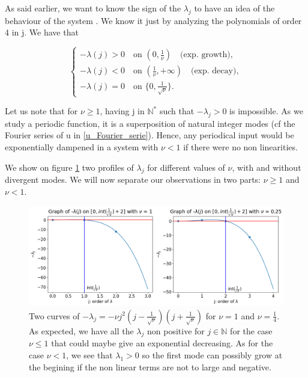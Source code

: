 \documentclass[12pt]{article}
\begin{document}
As said earlier, we want to know the sign of the $\lambda_j$ to have an idea of the behaviour of the system .
We know it just by analyzing the polynomials of order 4 in j. We have that

\begin{equation}
\left\{
\begin{aligned}
    -\lambda(j) > 0 \quad  \text{on } (0, \frac{1}{\nu}) \quad \text{(exp. growth)},\\
    -\lambda(j) < 0 \quad  \text{on } (\frac{1}{\nu}, +\infty)  \quad \text{(exp. decay)},\\
    -\lambda(j) = 0 \quad \text{on } \{0, \frac{1}{\sqrt{\nu}}\}.
\end{aligned}
\right.
\end{equation}

Let us note that for $\nu \geq 1$, having j in $\mathbb{N}^*$ such that $-\lambda_j > 0$ is impossible. As we study a periodic function,
 it is a superposition of natural integer modes (cf the Fourier series of u in \ref{u_Fourier_serie}). Hence, any periodical input would 
 be exponentially dampened in a system with $\nu <1 $ if there were no non linearities. 

We show on figure \ref{fig:KS_eq_lambda_growing_and_dampening} two profiles of $\lambda_j$ for different values of $\nu$, with and without
divergent modes. We will now separate our observations in two parts: $\nu \geq1$ and $\nu <1$.
\\

\begin{figure}[h]
\includegraphics[width=1\textwidth]{KS_eq/plot_dispersion_nu_1_1-4.png}
\caption{Two curves of $-\lambda_j = -\nu j^2(j-\frac{1}{\sqrt{\nu}})(j+\frac{1}{\sqrt{\nu}})$ for $\nu=1$ and $\nu=\frac{1}{4}$. 
As expected, we have all the $\lambda_j$ non positive for $j \in \mathbb{N}$ for the case $\nu \leq 1$ that could maybe give
an exponential decreasing. As for the case $\nu < 1$, we see that $\lambda_1 >0$ so the first mode can possibly grow at the begining if the 
 non linear terms are not to large and negative.} 
\label{fig:KS_eq_lambda_growing_and_dampening}
\end{figure}
\end{document}

